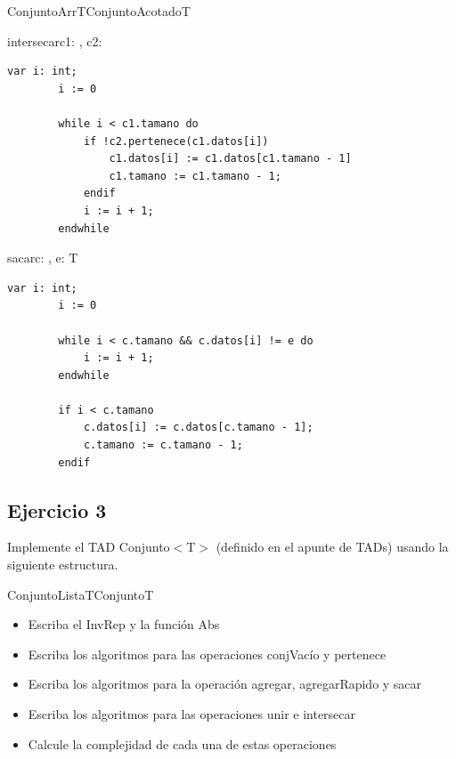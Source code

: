 \begin{module}{ConjuntoArr}{T}{ConjuntoAcotado}{T}
	\pagebreak

	\begin{proc}{intersecar}{\Inout c1: \moduletype, \In c2: \moduletype}{}
		\begin{lstlisting}[numbers=none,frame=none]
		var i: int;
		i := 0

		while i < c1.tamano do
			if !c2.pertenece(c1.datos[i])
				c1.datos[i] := c1.datos[c1.tamano - 1]
				c1.tamano := c1.tamano - 1;
			endif
			i := i + 1;
		endwhile
		\end{lstlisting}
	\end{proc}

	\begin{proc}{sacar}{\Inout c: \moduletype, \In e: T}{}
		\begin{lstlisting}[numbers=none,frame=none]
		var i: int;
		i := 0

		while i < c.tamano && c.datos[i] != e do
			i := i + 1;
		endwhile

		if i < c.tamano
			c.datos[i] := c.datos[c.tamano - 1];
			c.tamano := c.tamano - 1;
		endif
		\end{lstlisting}
	\end{proc}
\end{module}

\subsection{Ejercicio 3}
Implemente el TAD Conjunto$<$T$>$ (definido en el apunte de TADs) usando la siguiente estructura.

\begin{module}{ConjuntoLista}{T}{Conjunto}{T}
\end{module}

\begin{itemize}
	\item Escriba el InvRep y la función Abs
	\item Escriba los algoritmos para las operaciones conjVacío y pertenece
	\item Escriba los algoritmos para la operación agregar, agregarRapido y sacar
	\item Escriba los algoritmos para las operaciones unir e intersecar
	\item Calcule la complejidad de cada una de estas operaciones
\end{itemize}

